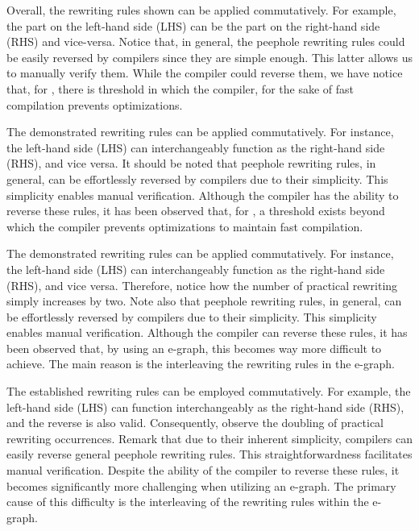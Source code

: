 

Overall, the rewriting rules shown can be applied commutatively. 
For example, the part on the left-hand side (LHS) can be the part on the right-hand side (RHS) and vice-versa. 
Notice that, in general, the peephole rewriting rules could be easily reversed by compilers since they are simple enough.
This latter allows us to manually verify them.
While the compiler could reverse them, we have notice that, for \Wasm, there is threshold in which the compiler, for the sake of fast compilation prevents optimizations.

The demonstrated rewriting rules can be applied commutatively. 
For instance, the left-hand side (LHS) can interchangeably function as the right-hand side (RHS), and vice versa. 
It should be noted that peephole rewriting rules, in general, can be effortlessly reversed by compilers due to their simplicity. 
This simplicity enables manual verification. 
Although the compiler has the ability to reverse these rules, it has been observed that, for \Wasm, a threshold exists beyond which the compiler prevents optimizations to maintain fast compilation.



The demonstrated rewriting rules can be applied commutatively. 
For instance, the left-hand side (LHS) can interchangeably function as the right-hand side (RHS), and vice versa. 
Therefore, notice how the number of practical rewriting simply increases by two.
Note also that peephole rewriting rules, in general, can be effortlessly reversed by compilers due to their simplicity. 
This simplicity enables manual verification. 
Although the compiler can reverse these rules, it has been observed that, by using an e-graph, this becomes way more difficult to achieve.
The main reason is the interleaving the rewriting rules in the e-graph.

The established rewriting rules can be employed commutatively. 
For example, the left-hand side (LHS) can function interchangeably as the right-hand side (RHS), and the reverse is also valid. 
Consequently, observe the doubling of practical rewriting occurrences. 
Remark that due to their inherent simplicity, compilers can easily reverse general peephole rewriting rules.  
This straightforwardness facilitates manual verification. 
Despite the ability of the compiler to reverse these rules, it becomes significantly more challenging when utilizing an e-graph. 
The primary cause of this difficulty is the interleaving of the rewriting rules within the e-graph.



